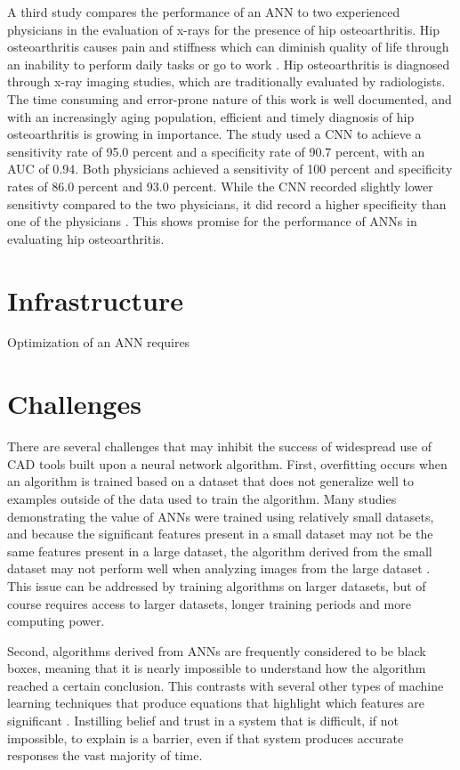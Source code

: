 \documentclass[sigconf]{acmart}
\begin{document}
A third study compares the performance of an ANN to two experienced physicians in the evaluation of x-rays for the presence of hip osteoarthritis. Hip osteoarthritis causes pain and stiffness which can diminish quality of life through an inability to perform daily tasks or go to work \cite{cite12}. Hip osteoarthritis is diagnosed through x-ray imaging studies, which are traditionally evaluated by radiologists. The time consuming and error-prone nature of this work is well documented, and with an increasingly aging population, efficient and timely diagnosis of hip osteoarthritis is growing in importance. The study used a CNN to achieve a sensitivity rate of 95.0 percent and a specificity rate of 90.7 percent, with an AUC of 0.94. Both physicians achieved a sensitivity of 100 percent and specificity rates of 86.0 percent and 93.0 percent. While the CNN recorded slightly lower sensitivty compared to the two physicians, it did record a higher specificity than one of the physicians \cite{cite12}. This shows promise for the performance of ANNs in evaluating hip osteoarthritis.

\section{Infrastructure}

Optimization of an ANN requires 

\section{Challenges}

There are several challenges that may inhibit the success of widespread use of CAD tools built upon a neural network algorithm. First, overfitting occurs when an algorithm is trained based on a dataset that does not generalize well to examples outside of the data used to train the algorithm. Many studies demonstrating the value of ANNs were trained using relatively small datasets, and because the significant features present in a small dataset may not be the  same features present in a large dataset, the algorithm derived from the small dataset may not perform well when analyzing images from the large dataset \cite{cite08}\cite{cite05}. This issue can be addressed by training algorithms on larger datasets, but of course requires access to larger datasets, longer training periods and more computing power.

Second, algorithms derived from ANNs are frequently considered to be black boxes, meaning that it is nearly impossible to understand how the algorithm reached a certain conclusion. This contrasts with several other types of machine learning techniques that produce equations that highlight which features are significant \cite{cite05}. Instilling belief and trust in a system that is difficult, if not impossible, to explain is a barrier, even if that system produces accurate responses the vast majority of time.
\end{document}
